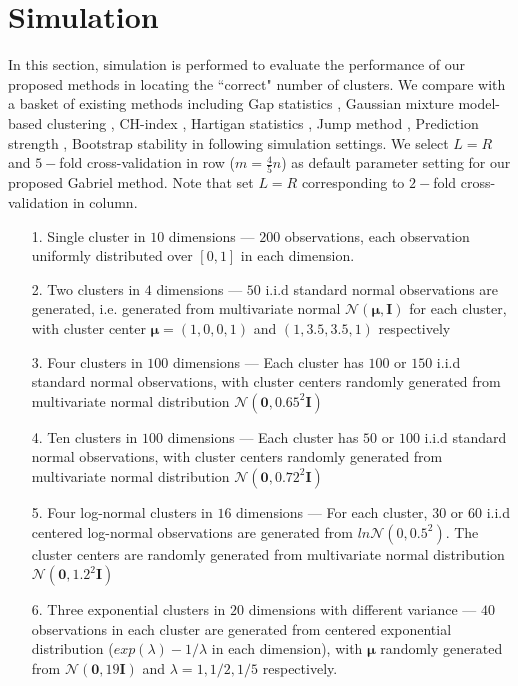 \documentclass[11pt]{article}
\begin{document}
\section{Simulation}
In this section, simulation is performed to evaluate the performance of our proposed methods in locating the ``correct" number of clusters. We compare with a basket of existing methods including Gap statistics \citep{tibshirani2001estimating}, Gaussian mixture model-based clustering \citep{fraley2002model}, CH-index \citep{calinski1974dendrite}, Hartigan statistics \citep{hartigan1975clustering}, Jump method \citep{sugar2003finding}, Prediction strength \citep{tibshirani2005cluster}, Bootstrap stability \citep{fang2012selection} in following simulation settings. We select $L=R$ and $5-$fold cross-validation in row ($m=\frac{4}{5}n$) as default parameter setting for our proposed Gabriel method. Note that set $L=R$ corresponding to $2-$fold cross-validation in column.
	\begin{enumerate}
		\item[1.] Single cluster in $10$ dimensions --- $200$ observations, each observation uniformly distributed over $[0,1]$ in each dimension. 
		\item[2.] Two clusters in $4$ dimensions --- $50$ i.i.d standard normal observations are generated, i.e. generated from multivariate normal $\mathcal{N}\left(\boldsymbol\mu,\mathbf{I}\right)$ for each cluster, with cluster center $\boldsymbol\mu = (1,0,0,1)$ and $(1,3.5,3.5,1)$ respectively  
		\item[3.] Four clusters in $100$ dimensions ---  Each cluster has $100$ or $150$ i.i.d standard normal observations, with cluster centers randomly generated from multivariate normal distribution $\mathcal{N}\left(\mathbf{0},0.65^2\mathbf{I}\right)$
		\item[4.] Ten clusters in $100$ dimensions ---  Each cluster has $50$ or $100$ i.i.d standard normal observations, with cluster centers randomly generated from multivariate normal distribution $\mathcal{N}\left(\mathbf{0},0.72^2\mathbf{I}\right)$
		\item[5.] Four log-normal clusters in $16$ dimensions --- For each cluster, $30$ or $60$ i.i.d centered log-normal observations are generated from $ln\mathcal{N}\left(0,0.5^2 \right)$. The cluster centers are randomly generated from multivariate normal distribution $\mathcal{N}\left(\mathbf{0},1.2^2\mathbf{I}\right)$
		\item[6.] Three exponential clusters in $20$ dimensions with different variance --- $40$ observations in each cluster are generated from centered exponential distribution ($exp(\lambda)-1/\lambda$ in each dimension), with $\boldsymbol\mu$ randomly generated from  $\mathcal{N}\left(\mathbf{0},19\mathbf{I}\right)$ and $\lambda = 1, 1/2, 1/5 $ respectively.
	\end{enumerate}
\end{document}
